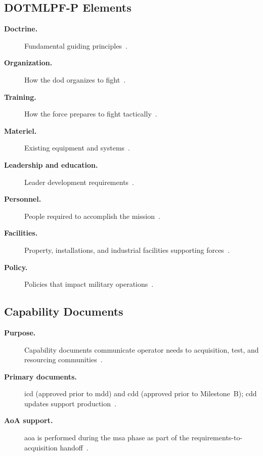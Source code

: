 \documentclass[../main.tex]{subfiles}
\begin{document}
\subsection{DOTMLPF-P Elements}
\begin{description}
  \item[\textbf{Doctrine.}] Fundamental guiding principles~\autocite{edo-3-3-3-jcids-2025}.
  \item[\textbf{Organization.}] How the \ac{dod} organizes to fight~\autocite{edo-3-3-3-jcids-2025}.
  \item[\textbf{Training.}] How the force prepares to fight tactically~\autocite{edo-3-3-3-jcids-2025}.
  \item[\textbf{Materiel.}] Existing equipment and systems~\autocite{edo-3-3-3-jcids-2025}.
  \item[\textbf{Leadership and education.}] Leader development requirements~\autocite{edo-3-3-3-jcids-2025}.
  \item[\textbf{Personnel.}] People required to accomplish the mission~\autocite{edo-3-3-3-jcids-2025}.
  \item[\textbf{Facilities.}] Property, installations, and industrial facilities supporting forces~\autocite{edo-3-3-3-jcids-2025}.
  \item[\textbf{Policy.}] Policies that impact military operations~\autocite{edo-3-3-3-jcids-2025}.
\end{description}

\subsection{Capability Documents}
\begin{description}
  \item[\textbf{Purpose.}] Capability documents communicate operator needs to acquisition, test, and resourcing communities~\autocite{edo-3-3-3-jcids-2025}.
  \item[\textbf{Primary documents.}] \ac{icd} (approved prior to \ac{mdd}) and \ac{cdd} (approved prior to Milestone~B); \ac{cdd} updates support production~\autocite{edo-3-3-3-jcids-2025}.
  \item[\textbf{AoA support.}] \ac{aoa} is performed during the \ac{msa} phase as part of the requirements-to-acquisition handoff~\autocite{edo-3-3-3-jcids-2025}.
\end{description}
\end{document}
